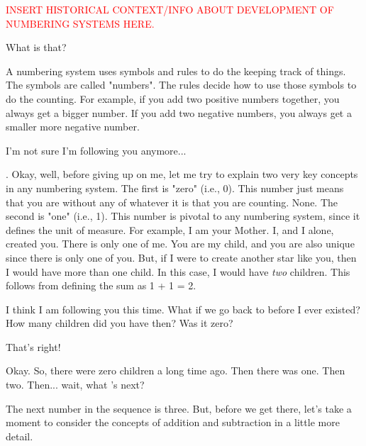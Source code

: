 \documentclass[main.tex]{subfiles}
\begin{document}
\begin{tcolorbox}[sharp corners, colback=red!30, colframe=red!80!blue, title=Numbering Systems]
\par \textcolor{red} {INSERT HISTORICAL CONTEXT/INFO ABOUT DEVELOPMENT OF NUMBERING SYSTEMS HERE.}
\end{tcolorbox}

\par \Maia What is that?

\par \Pleione A numbering system uses symbols and rules to do the keeping track of things.  The symbols are called "numbers".  The rules decide how to use those symbols to do the counting.  For example, if you add two positive numbers together, you always get a bigger number.  If you add two negative numbers, you always get a smaller more negative number.  

\par \Maia I'm not sure I'm following you anymore...

\par \Pleione. Okay, well, before giving up on me, let me try to explain two very key concepts in any numbering system.  The first is "zero" (i.e., 0).  This number just means that you are without any of whatever it is that you are counting.  None.  The second is "one" (i.e., 1).  This number is pivotal to any numbering system, since it defines the unit of measure.  For example, I am your Mother.  I, and I alone, created you.  There is only one of me.  You are my child, and you are also unique since there is only one of you.  But, if I were to create another star like you, then I would have more than one child.  In this case, I would have \textit{two} children.  This follows from defining the sum as 1 + 1 = 2.

\par \Maia I think I am following you this time.  What if we go back to before I ever existed?  How many children did you have then?  Was it zero?

\par \Pleione That's right!

\par \Maia Okay.  So, there were zero children a long time ago.  Then there was one.  Then two.  Then... wait, what 's next?

\par \Pleione The next number in the sequence is three.  But, before we get there, let's take a moment to consider the concepts of addition and subtraction in a little more detail.
\end{document}
